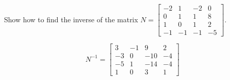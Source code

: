 
\begin{exerciseStatement}


Show how to find the inverse of the matrix \(N= \left[\begin{array}{cccc}
-2 & 1 & -2 & 0 \\
0 & 1 & 1 & 8 \\
1 & 0 & 1 & 2 \\
-1 & -1 & -1 & -5
\end{array}\right] \).


\end{exerciseStatement}
    
\begin{exerciseAnswer} 
\[N^{-1}= \left[\begin{array}{cccc}
3 & -1 & 9 & 2 \\
-3 & 0 & -10 & -4 \\
-5 & 1 & -14 & -4 \\
1 & 0 & 3 & 1
\end{array}\right] \]
\end{exerciseAnswer}
    
